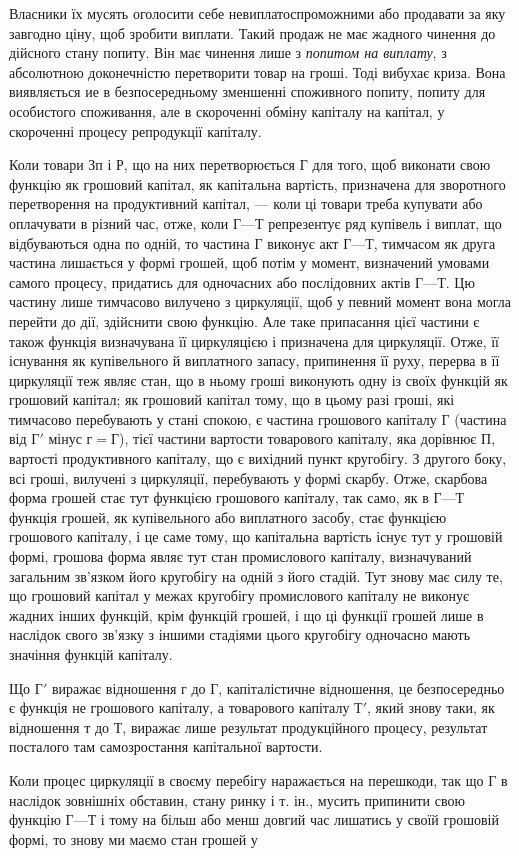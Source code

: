 \parcont{}  %
Власники їх мусять оголосити себе невиплатоспроможними або продавати
за яку завгодно ціну, щоб зробити виплати. Такий продаж не має
жадного чинення до дійсного стану попиту. Він має чинення лише
з \emph{попитом на виплату}, з абсолютною доконечністю перетворити товар на
гроші. Тоді вибухає криза. Вона виявляється ие в безпосередньому
зменшенні споживного попиту, попиту для особистого споживання, але
в скороченні обміну капіталу на капітал, у скороченні процесу репродукції
капіталу.

Коли товари $Зп$ і $Р$, що на них перетворюється $Г$ для того, щоб
виконати свою функцію як грошовий капітал, як капітальна
вартість, призначена для зворотного перетворення на продуктивний
капітал, — коли ці товари треба купувати або оплачувати в різний час,
отже, коли $Г — Т$ репрезентує ряд купівель і виплат, що відбуваються
одна по одній, то частина $Г$ виконує акт $Г — Т$, тимчасом як друга частина
лишається у формі грошей, щоб потім у момент, визначений умовами
самого процесу, придатись для одночасних або послідовних актів $Г — Т$.
Цю частину лише тимчасово вилучено з циркуляції, щоб у певний
момент вона могла перейти до дії, здійснити свою функцію. Але таке
припасання цієї частини є також функція визначувана її циркуляцією
і призначена для циркуляції. Отже, її існування як купівельного й виплатного
запасу, припинення її руху, перерва в її циркуляції теж являє стан,
що в ньому гроші виконують одну із своїх функцій як грошовий капітал; як
грошовий капітал тому, що в цьому разі гроші, які тимчасово перебувають
у стані спокою, є частина грошового капіталу $Г$ (частина від
$Г'$ мінус $г = Г$), тієї частини вартости товарового капіталу, яка дорівнює $П$,
вартості продуктивного капіталу, що є вихідний пункт кругобігу. З другого
боку, всі гроші, вилучені з циркуляції, перебувають у формі скарбу.
Отже, скарбова форма грошей стає тут функцією грошового капіталу, так
само, як в $Г — Т$ функція грошей, як купівельного або виплатного засобу, стає
функцією грошового капіталу, і це саме тому, що капітальна вартість
існує тут у грошовій формі, грошова форма являє тут стан промислового
капіталу, визначуваний загальним зв’язком його кругобігу на одній з його
стадій. Тут знову має силу те, що грошовий капітал у межах кругобігу
промислового капіталу не виконує жадних інших функцій, крім функцій
грошей, і що ці функції грошей лише в наслідок свого зв’язку
з іншими стадіями цього кругобігу одночасно мають значіння функцій
капіталу.

Що $Г'$ виражає відношення $г$ до $Г$, капіталістичне відношення, це
безпосередньо є функція не грошового капіталу, а товарового капіталу $Т'$,
який знову таки, як відношення $т$ до $Т$, виражає лише результат продукційного
процесу, результат посталого там самозростання капітальної
вартости.

Коли процес циркуляції в своєму перебігу наражається на перешкоди,
так що $Г$ в наслідок зовнішніх обставин, стану ринку і т. ін., мусить
припинити свою функцію $Г — Т$ і тому на більш або менш довгий час
лишатись у своїй грошовій формі, то знову ми маємо стан грошей у
\parbreak{}  %
